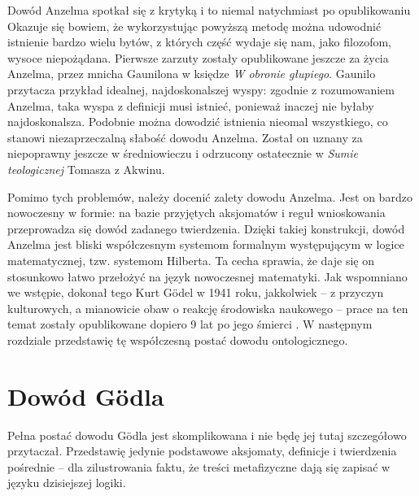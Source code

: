 \documentclass[
	runningheads
]{llncs}
\begin{document}
Dowód Anzelma spotkał się z krytyką i to niemal natychmiast po opublikowaniu Okazuje się bowiem, że wykorzystując powyższą metodę można udowodnić istnienie bardzo wielu bytów, z których część wydaje się nam, jako filozofom, wysoce niepożądana. Pierwsze zarzuty zostały opublikowane jeszcze za życia Anzelma, przez mnicha Gaunilona w księdze \textit{W obronie głupiego}. Gaunilo przytacza przykład idealnej, najdoskonalszej wyspy: zgodnie z rozumowaniem Anzelma, taka wyspa z definicji musi istnieć, ponieważ inaczej nie byłaby najdoskonalsza. Podobnie można dowodzić istnienia nieomal wszystkiego, co stanowi niezaprzeczalną słabość dowodu Anzelma. Został on uznany za niepoprawny jeszcze w średniowieczu i odrzucony ostatecznie w \textit{Sumie teologicznej} Tomasza z Akwinu. 

Pomimo tych problemów, należy docenić zalety dowodu Anzelma. Jest on bardzo nowoczesny w formie: na bazie przyjętych aksjomatów i reguł wnioskowania przeprowadza się dowód zadanego twierdzenia. Dzięki takiej konstrukcji, dowód Anzelma jest bliski współczesnym systemom formalnym występującym w logice matematycznej, tzw. systemom Hilberta. Ta cecha sprawia, że daje się on stosunkowo łatwo przełożyć na język nowoczesnej matematyki. Jak wspomniano we wstępie, dokonał tego Kurt G\"odel w 1941 roku, jakkolwiek -- z przyczyn kulturowych, a mianowicie obaw o reakcję środowiska naukowego -- prace na ten temat zostały opublikowane dopiero 9 lat po jego śmierci \cite{goedel1995}. W następnym rozdziale przedstawię tę współczesną postać dowodu ontologicznego. 

\section{Dowód G\"odla} \label{sec:dowod-godla}
Pełna postać dowodu G\"odla jest skomplikowana i nie będę jej tutaj szczegółowo przytaczał. Przedstawię jedynie podstawowe aksjomaty, definicje i twierdzenia pośrednie -- dla zilustrowania faktu, że treści metafizyczne dają się zapisać w języku dzisiejszej logiki. 
\end{document}
